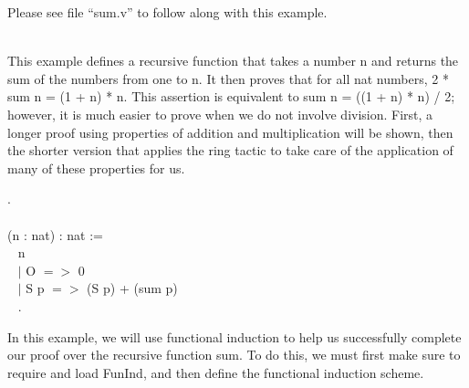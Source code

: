 
Please see file ``sum.v'' to follow along with this example. 

~\\
This example defines a recursive function that takes a number n and returns the sum of the numbers from one to n.
It then proves that for all nat numbers, 2 * sum n = (1 + n) * n.
This assertion is equivalent to sum n = ((1 + n) * n) / 2; 
however, it is much easier to prove when we do not involve division.
First, a longer proof using properties of addition and multiplication will be shown, 
then the shorter version that applies the ring tactic to take care of the application of many of these properties for us.

\begin{code}
	\Load {}.
	\\ \\
	\Fixpoint {} (n : nat) : nat := 		\\ \-\ \quad
	\match n \with						\\ \-\ \quad
	$\mid$ O $=>$ 0					\\ \-\ \quad
	$\mid$ S p $=>$ (S p) + (sum p)		\\ \-\ \quad
	\End.
\end{code}

\noindent
In this example, we will use functional induction to help us successfully complete our proof over the recursive function sum.
To do this, we must first make sure to require and load FunInd, and then define the functional induction scheme.





